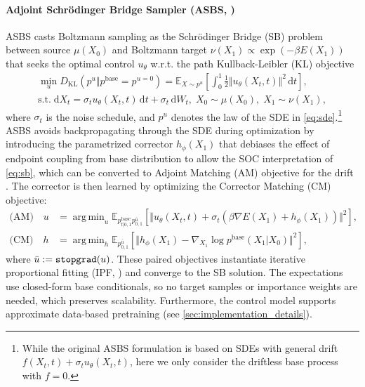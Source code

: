 \documentclass[]{fairmeta}
\DeclareMathOperator*{\argmin}{arg\,min}
\theoremstyle{remark}
\begin{document}
\paragraph{Adjoint Schr\"odinger Bridge Sampler (ASBS, \citealp{liu2025adjoint})}
ASBS casts Boltzmann sampling as the Schr\"odinger Bridge (SB) problem between source $\mu(X_0)$ and Boltzmann target $\nu(X_1) \propto \exp(-\beta E(X_1))$ that seeks the optimal control $u_\theta$ w.r.t. the path Kullback-Leibler (KL) objective
\begin{gather}
\min_u D_\text{KL}(p^u \Vert p^\text{base} = p^{u=0}) = \mathbb{E}_{X \sim p^u} \left[\int_0^1 \frac{1}{2} \Vert u_\theta(X_t, t) \Vert^2 \, \mathrm{d}t\right], \label{eq:sb} \\
\text{s.t.} \; \mathrm{d}X_t = \sigma_t u_\theta (X_t, t) \, \mathrm{d}t + \sigma_t \, \mathrm{d}W_t, \; X_0 \sim \mu(X_0), \; X_1 \sim \nu(X_1), \label{eq:sde}
\end{gather}
where $\sigma_t$ is the noise schedule, and $p^u$ denotes the law of the SDE in \cref{eq:sde}.\footnote{While the original ASBS formulation is based on SDEs with general drift $f(X_t, t) + \sigma_t u_\theta(X_t, t)$, here we only consider the driftless base process with $f = 0$.}
ASBS avoids backpropagating through the SDE during optimization by introducing the parametrized corrector $h_\phi(X_1)$ that debiases the effect of endpoint coupling from base distribution to allow the SOC interpretation of \cref{eq:sb}, which can be converted to Adjoint Matching (AM) objective for the drift \citep{havens2025adjoint}.
The corrector is then learned by optimizing the Corrector Matching (CM) objective:
\begin{align}
\text{(AM)} \quad u &= \argmin_u \mathbb{E}_{p_{t|0,1}^\text{base} p_{0,1}^{\bar{u}}} [\Vert u_\theta(X_t, t) + \sigma_t (\beta \nabla E(X_1) + h_\phi(X_1)) \Vert^2 ], \label{eq:am} \\
\text{(CM)} \quad h &= \argmin_h \mathbb{E}_{p_{0,1}^{\bar{u}}} [ \Vert h_\phi(X_1) - \nabla_{X_1} \log p^\text{base}(X_1 | X_0) \Vert^2], \label{eq:cm}
\end{align}
where $\bar{u} := \text{\texttt{stopgrad}}(u)$.
These paired objectives instantiate iterative proportional fitting (IPF, \citealp{kullback1968probability}) and converge to the SB solution.
The expectations use closed-form base conditionals, so no target samples or importance weights are needed, which preserves scalability.
Furthermore, the control model supports approximate data-based pretraining (see \cref{sec:implementation_details}).
\end{document}
